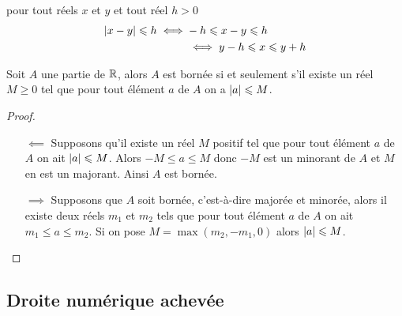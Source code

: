  \begin{prop}
    pour tout réels \(x\) et \(y\) et tout réel \(h>0\)
    \begin{align}
      \left\lvert x-y\right\rvert\leqslant h \iff & -h \leqslant x-y \leqslant h\\
                                &\iff y-h \leqslant x \leqslant y+h
    \end{align}
  \end{prop}
  \begin{prop}
    Soit \(A\) une partie de \(\mathbb{R}\), alors \(A\) est bornée si et seulement s'il 
    existe un réel \(M\geqslant 0\) tel que pour tout élément \(a\) de \(A\) on 
    a \(\left\lvert a\right\rvert\leqslant M\).
  \end{prop}
  \begin{proof}
    \begin{itemize}
      \item[\(\impliedby\)] Supposons qu'il existe un réel \(M\) positif tel que 
        pour tout élément \(a\) de \(A\) on ait \(\left\lvert a\right\rvert\leqslant M\). Alors 
        \(-M\leqslant a\leqslant M\) donc \(-M\) est un minorant de \(A\) et 
        \(M\) en est un majorant. Ainsi \(A\) est bornée.
      \item[\(\implies\)] Supposons que \(A\) soit bornée, c'est-à-dire majorée 
        et minorée, alors il existe deux réels \(m_1\) et \(m_2\) tels que pour 
        tout élément \(a\) de \(A\) on ait \(m_1\leqslant a\leqslant m_2\). Si 
        on pose \(M=\max(m_2,-m_1,0)\) alors \(\left\lvert a\right\rvert\leqslant M\).
    \end{itemize}
  \end{proof}

  \subsection{Droite numérique achevée}

